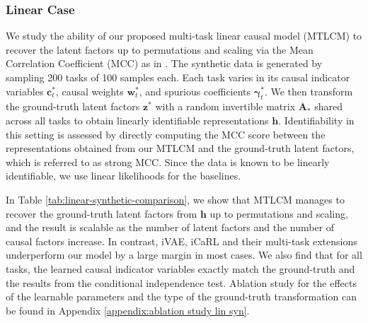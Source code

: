 \documentclass{article} %
\theoremstyle{plain}
\theoremstyle{definition}
\theoremstyle{remark}
\begin{document}
\subsubsection{Linear Case}\label{sec:linear-experiment}
\vspace{-0.75ex}
We study the ability of our proposed multi-task linear causal model (MTLCM) to recover the latent factors up to permutations and scaling via the Mean Correlation Coefficient (MCC) as in \citet{Khemakhem_Kingma_Monti_Hyvarinen_2020}. The synthetic data is generated by sampling 200 tasks of 100 samples each. Each task
varies in its causal indicator variables $\mathbf{c}_t^*$, causal weights $\mathbf{w}_t^*$, and spurious coefficients $\boldsymbol{\gamma}_t^*$. We then transform the ground-truth latent factors $\mathbf{z}^*$ with a random invertible matrix $\mathbf{A}_*$ shared across all tasks to obtain linearly identifiable representations $\mathbf{h}$.
Identifiability in this setting is assessed by directly computing the MCC score between the representations obtained from our MTLCM and the ground-truth latent factors, which is referred to as strong MCC.
Since the data is known to be linearly identifiable, we use linear likelihoods for the baselines.

In Table \ref{tab:linear-synthetic-comparison}, we show that MTLCM manages to recover the ground-truth latent factors from $\mathbf{h}$ up to permutations and scaling, and the result is scalable as the number of latent factors and the number of causal factors increase. In contrast, iVAE, iCaRL and their multi-task extensions underperform our model by a large margin in most cases.
We also find that for all tasks, the learned causal indicator variables exactly match the ground-truth and the results from the conditional independence test. Ablation study for the effects of the learnable parameters and the type of the ground-truth transformation can be found in Appendix \ref{appendix:ablation study lin syn}.
\end{document}
